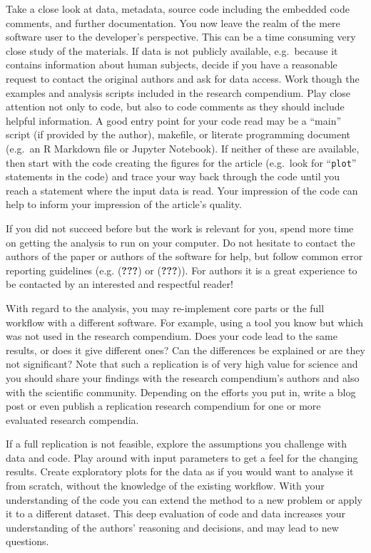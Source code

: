 \documentclass[twocolumn]{article}
\begin{document}
Take a close look at data, metadata, source code including the embedded
code comments, and further documentation. You now leave the realm of the
mere software user to the developer's perspective. This can be a time
consuming very close study of the materials. If data is not publicly
available, e.g.~because it contains information about human subjects,
decide if you have a reasonable request to contact the original authors
and ask for data access. Work though the examples and analysis scripts
included in the research compendium. Play close attention not only to
code, but also to code comments as they should include helpful
information. A good entry point for your code read may be a ``main''
script (if provided by the author), makefile, or literate programming
document (e.g.~an R Markdown file or Jupyter Notebook). If neither of
these are available, then start with the code creating the figures for
the article (e.g.~look for ``\texttt{plot}'' statements in the code) and
trace your way back through the code until you reach a statement where
the input data is read. Your impression of the code can help to inform
your impression of the article's quality.

If you did not succeed before but the work is relevant for you, spend
more time on getting the analysis to run on your computer. Do not
hesitate to contact the authors of the paper or authors of the software
for help, but follow common error reporting guidelines (e.g.
({\textbf{???}}) or ({\textbf{???}})). For authors it is a great
experience to be contacted by an interested and respectful reader!

With regard to the analysis, you may re-implement core parts or the full
workflow with a different software. For example, using a tool you know
but which was not used in the research compendium. Does your code lead
to the same results, or does it give different ones? Can the differences
be explained or are they not significant? Note that such a replication
is of very high value for science and you should share your findings
with the research compendium's authors and also with the scientific
community. Depending on the efforts you put in, write a blog post or
even publish a replication research compendium for one or more evaluated
research compendia.

If a full replication is not feasible, explore the assumptions you
challenge with data and code. Play around with input parameters to get a
feel for the changing results. Create exploratory plots for the data as
if you would want to analyse it from scratch, without the knowledge of
the existing workflow. With your understanding of the code you can
extend the method to a new problem or apply it to a different dataset.
This deep evaluation of code and data increases your understanding of
the authors' reasoning and decisions, and may lead to new questions.
\end{document}
